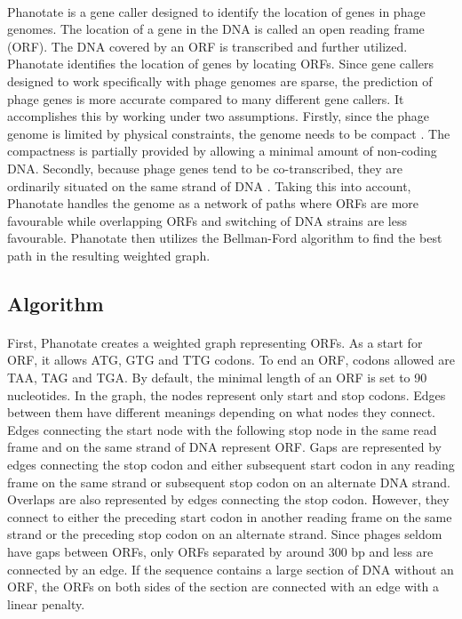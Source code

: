 \paragraph*{}
Phanotate\cite{mcnair2019phanotate} is a gene caller designed to identify the location of genes in phage genomes. The location of a gene in the DNA is called an open reading frame (ORF). The DNA covered by an ORF is transcribed and further utilized. Phanotate identifies the location of genes by locating ORFs. Since gene callers designed to work specifically with phage genomes are sparse, the prediction of phage genes is more accurate compared to many different gene callers. It accomplishes this by working under two assumptions. Firstly, since the phage genome is limited by physical constraints, the genome needs to be compact \cite{kang2017prophage}. The compactness is partially provided by allowing a minimal amount of non-coding DNA. Secondly, because phage genes tend to be co-transcribed, they are ordinarily situated on the same strand of DNA \cite{akhter2012phispy}. Taking this into account, Phanotate handles the genome as a network of paths where ORFs are more favourable while overlapping ORFs and switching of DNA strains are less favourable. Phanotate then utilizes the Bellman-Ford algorithm to find the best path in the resulting weighted graph.

\subsection{Algorithm}
\paragraph*{}
First, Phanotate creates a weighted graph representing ORFs. As a start for ORF, it allows ATG, GTG and TTG codons. To end an ORF, codons allowed are TAA, TAG and TGA. By default, the minimal length of an ORF is set to 90 nucleotides. In the graph, the nodes represent only start and stop codons. Edges between them have different meanings depending on what nodes they connect. Edges connecting the start node with the following stop node in the same read frame and on the same strand of DNA represent ORF. Gaps are represented by edges connecting the stop codon and either subsequent start codon in any reading frame on the same strand or subsequent stop codon on an alternate DNA strand. Overlaps are also represented by edges connecting the stop codon. However, they connect to either the preceding start codon in another reading frame on the same strand or the preceding stop codon on an alternate strand. Since phages seldom have gaps between ORFs, only ORFs separated by around 300 bp and less are connected by an edge. If the sequence contains a large section of DNA without an ORF, the ORFs on both sides of the section are connected with an edge with a linear penalty.


